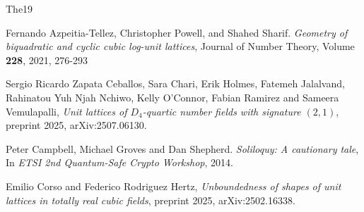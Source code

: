 \documentclass{amsart}
\numberwithin{equation}{section}
\begin{document}
%
%
%
\begin{thebibliography}{{The}19}



Fernando Azpeitia-Tellez, Christopher Powell, and Shahed Sharif.
\emph{Geometry of biquadratic and cyclic cubic log-unit lattices},
Journal of Number Theory,
Volume {\bf 228},
2021,
276-293

%
%
%
%







 Sergio Ricardo Zapata Ceballos, Sara Chari, Erik Holmes, Fatemeh Jalalvand, Rahinatou Yuh Njah Nchiwo, Kelly O'Connor, Fabian Ramirez and Sameera Vemulapalli, {\em Unit lattices of $D_4$-quartic number fields with signature $(2,1)$},  preprint 2025, arXiv:2507.06130.


  Peter Campbell, Michael Groves and Dan Shepherd. \emph{Soliloquy: A cautionary tale}, In \emph{ETSI 2nd Quantum-Safe Crypto Workshop}, 2014.

 Emilio Corso and Federico Rodriguez Hertz, {\em Unboundedness of shapes of unit lattices in totally real cubic fields},  preprint 2025, arXiv:2502.16338.



\end{thebibliography}
\end{document}

